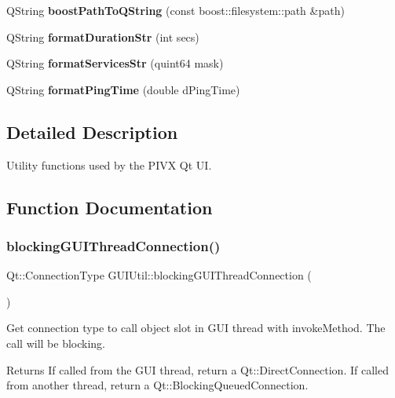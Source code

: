 \begin{DoxyCompactItemize}
Q\+String {\bfseries boost\+Path\+To\+Q\+String} (const boost\+::filesystem\+::path \&path)
\item 
\mbox{\label{namespace_g_u_i_util_aaf51686c47c77ad81c51d115d150e867}} 
Q\+String {\bfseries format\+Duration\+Str} (int secs)
\item 
\mbox{\label{namespace_g_u_i_util_ac0c0a23fbbfefc827220eebcacc3ee63}} 
Q\+String {\bfseries format\+Services\+Str} (quint64 mask)
\item 
\mbox{\label{namespace_g_u_i_util_a432bcee36e242a968c9149fadfba44fa}} 
Q\+String {\bfseries format\+Ping\+Time} (double d\+Ping\+Time)
\end{DoxyCompactItemize}


\subsection{Detailed Description}
Utility functions used by the P\+I\+VX Qt UI. 

\subsection{Function Documentation}
\mbox{\label{namespace_g_u_i_util_a2046fc343a70996c23cae6fe7f8d94f2}} 
\subsubsection{\texorpdfstring{blocking\+G\+U\+I\+Thread\+Connection()}{blockingGUIThreadConnection()}}
{\footnotesize\ttfamily Qt\+::\+Connection\+Type G\+U\+I\+Util\+::blocking\+G\+U\+I\+Thread\+Connection (\begin{DoxyParamCaption}{ }\end{DoxyParamCaption})}

Get connection type to call object slot in G\+UI thread with invoke\+Method. The call will be blocking.

\begin{DoxyReturn}{Returns}
If called from the G\+UI thread, return a Qt\+::\+Direct\+Connection. If called from another thread, return a Qt\+::\+Blocking\+Queued\+Connection. 
\end{DoxyReturn}
\mbox{\label{namespace_g_u_i_util_aad7852433ad4953a9bcae9a6e735b2d4}} 
